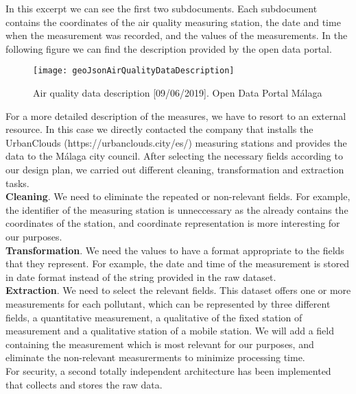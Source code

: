In this excerpt we can see the first two subdocuments.
Each subdocument contains the coordinates of the air quality measuring station, the date and time when the measurement was recorded, and the values of the measurements.
In the following figure we can find the description provided by the open data portal.\\
    
\begin{figure}[ht]
    \centering
    \texttt{[image: geoJsonAirQualityDataDescription]}
    \caption{Air quality data description [09/06/2019]. Open Data Portal Málaga}
\end{figure}

For a more detailed description of the measures, we have to resort to an external resource.
In this case we directly contacted the company that installs the UrbanClouds (https://urbanclouds.city/es/) measuring stations and provides the data to the Málaga city council.
After selecting the necessary fields according to our design plan, we carried out different cleaning, transformation and extraction tasks. \\

\textbf{Cleaning}. We need to eliminate the repeated or non-relevant fields.
For example, the identifier of the measuring station is unneccessary as the  already contains the coordinates of the station, and coordinate representation is more interesting for our purposes. \\

\textbf{Transformation}. We need the values to have a format appropriate to the fields that they represent.
For example, the date and time of the measurement is stored in date format instead of the string provided in the raw dataset. \\

\textbf{Extraction}. We need to select the relevant fields.
This dataset offers one or more measurements for each pollutant, which can be represented by three different fields, a quantitative measurement, a qualitative of the fixed station of measurement and a qualitative station of a mobile station.
We will add a field containing the measurement which is most relevant for our purposes, and eliminate the non-relevant measurerments to minimize processing time. \\

For security, a second totally independent architecture has been implemented that collects and stores the raw data.